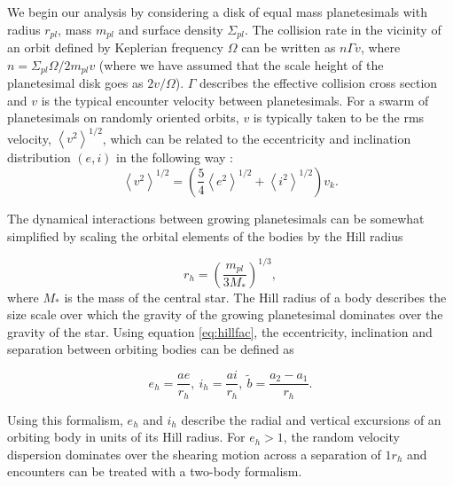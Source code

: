 We begin our analysis by considering a disk of equal mass planetesimals
with radius $r_{pl}$, mass $m_{pl}$ and surface density
$\Sigma_{pl}$. The collision rate in the vicinity of an orbit defined
by Keplerian frequency $\Omega$ can be written as $n \Gamma v$, where
$n = \Sigma_{pl} \Omega / 2 m_{pl} v$ (where we have assumed that the scale height of the planetesimal disk goes as $2v/\Omega$). $\Gamma$ describes the effective
collision cross section and $v$ is the typical encounter velocity
between planetesimals.
For a swarm of planetesimals on randomly oriented orbits, $v$ is typically
taken to be the rms velocity, $\left< v^{2} \right>^{1/2}$, which can be related to the eccentricity and inclination distribution $(e, i)$ in the following way \cite{lissauer93}:
\begin{equation}\label{eq:ecc_vel}
	\left< v^{2} \right>^{1/2} = \left( \frac{5}{4} \left< e^{2} \right>^{1/2} + \left< i^{2} \right>^{1/2}  \right) v_{k}.
\end{equation}

The dynamical interactions between growing planetesimals can be somewhat simplified by scaling the orbital elements of the bodies by
the Hill radius

\begin{equation}\label{eq:hillfac}
	r_{h} = \left(\frac{m_{pl}}{3 M_{*}}\right)^{1/3}, 
\end{equation}
\noindent where $M_{*}$ is the mass of the central star. The Hill radius of a body describes the size scale over which the gravity of the growing planetesimal dominates over the gravity of the star. Using equation \ref{eq:hillfac}, the eccentricity, inclination and separation between orbiting bodies can be defined as

\begin{equation}\label{eq:hillorb}
	e_{h} = \frac{a e}{r_{h}}, \: i_{h} = \frac{a i}{r_{h}}, \: \tilde{b} = \frac{a_{2} - a_{1}}{r_{h}}.
\end{equation}

\noindent Using this formalism, $e_{h}$ and $i_{h}$ describe the radial and vertical excursions of an orbiting body in units of its Hill radius. For $e_{h} > 1$, the random velocity dispersion dominates over the shearing motion across a separation of $1 r_{h}$ and encounters can be treated with a two-body formalism.

